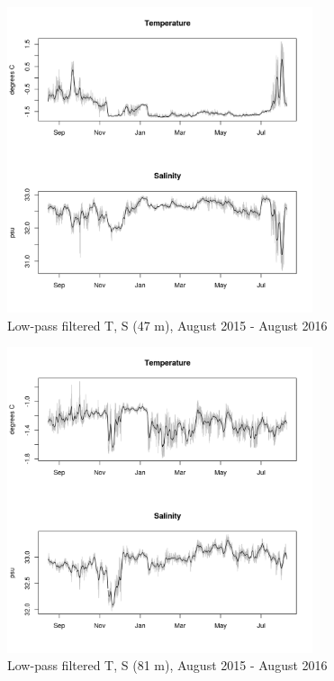 \documentclass[12pt]{dforeport}
\begin{document}
\begin{figure}  
\centering
\includegraphics[width = 0.8\textwidth]{./figures/33_lpf_TS_47m_2015_2016.png}
\caption[Low-pass filtered T, S (47 m), 2015-2016]{Low-pass filtered T, S (47 m), August 2015 - August 2016}
\label{f:ctd_47_lpf_2015_2016}
\end{figure}

\begin{figure}  
\centering
\includegraphics[width = 0.8\textwidth]{./figures/34_lpf_TS_81m_2015_2016.png}
\caption[Low-pass filtered T, S (81 m), 2015-2016]{Low-pass filtered T, S (81 m), August 2015 - August 2016}
\label{f:ctd_81_lpf_2015_2016}
\end{figure}
\end{document}
